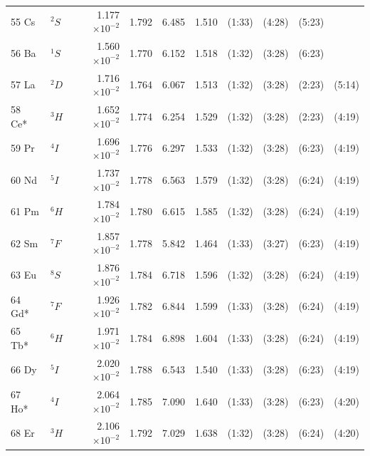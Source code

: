 \begin{longtable}{l l r r r r r r r r}
55 Cs 	&  	$^{2}S$   	&   	1.177$\times10^{-2}$   	&    	1.792    	&    	6.485    	&    	1.510    	&    	(1:33)    	&    	(4:28)    	&    	(5:23)   \\
56 Ba 	&  	$^{1}S$   	&   	1.560$\times10^{-2}$   	&    	1.770    	&    	6.152    	&    	1.518    	&    	(1:32)    	&    	(3:28)    	&    	(6:23)   \\
57 La 	&  	$^{2}D$   	&   	1.716$\times10^{-2}$   	&    	1.764    	&    	6.067    	&    	1.513    	&    	(1:32)    	&    	(3:28)    	&    	(2:23)     	&	(5:14)     	\\
58 Ce* 	&  	$^{3}H$   	&   	1.652$\times10^{-2}$   	&    	1.774    	&    	6.254    	&    	1.529    	&    	(1:32)    	&    	(3:28)    	&    	(2:23)     	&	(4:19)     	\\
59 Pr 	&  	$^{4}I$ 	&   	1.696$\times10^{-2}$   	&    	1.776    	&    	6.297    	&    	1.533    	&    	(1:32)    	&    	(3:28)    	&    	(6:23)     	& 	(4:19)     	\\
60 Nd 	&  	$^{5}I$ 	&   	1.737$\times10^{-2}$   	&    	1.778    	&    	6.563    	&    	1.579    	&    	(1:32)    	&    	(3:28)    	&    	(6:24)     	& 	(4:19)     	\\
61 Pm 	&  	$^{6}H$   	&   	1.784$\times10^{-2}$   	&    	1.780    	&    	6.615    	&    	1.585    	&    	(1:32)    	&    	(3:28)    	&    	(6:24)     	& 	(4:19)     	\\
62 Sm 	&  	$^{7}F$   	&   	1.857$\times10^{-2}$   	&    	1.778    	&    	5.842    	&    	1.464    	&    	(1:33)    	&    	(3:27)    	&    	(6:23)     	& 	(4:19)     	\\
63 Eu 	&  	$^{8}S$   	&   	1.876$\times10^{-2}$   	&    	1.784    	&    	6.718    	&    	1.596    	&    	(1:32)    	&    	(3:28)    	&    	(6:24)     	&  	(4:19)     	\\
64 Gd* 	&  	$^{7}F$   	&   	1.926$\times10^{-2}$   	&    	1.782    	&    	6.844    	&    	1.599    	&    	(1:33)    	&    	(3:28)    	&    	(6:24)     	&  	(4:19)     	\\
65 Tb* 	&  	$^{6}H$   	&   	1.971$\times10^{-2}$	&  	1.784	&   	6.898	&  	1.604	& 	(1:33) 	& 	(3:28) 	& 	(6:24)  	& 	(4:19)	\\   	   	   	
66 Dy 	&  	$^{5}I$ 	&   	2.020$\times10^{-2}$ 	& 	1.788 	& 	6.543 	& 	1.540 	& 	(1:33) 	& 	(3:28) 	& 	(6:23)  	& 	(4:19)	\\   	   	   	
67 Ho* 	&  	$^{4}I$ 	&   	2.064$\times10^{-2}$ 	&  	1.785	&    	7.090	&  	1.640	& 	(1:33) 	& 	(3:28) 	& 	(6:23)  	& 	(4:20)	\\   	   	  	
68 Er 	&  	$^{3}H$   	&   	2.106$\times10^{-2}$   	&   	1.792   	&   	7.029   	&   	1.638   	&   	(1:32)   	&   	(3:28)   	&   	(6:24)   	&   	(4:20)     	\\   	

\end{longtable}
